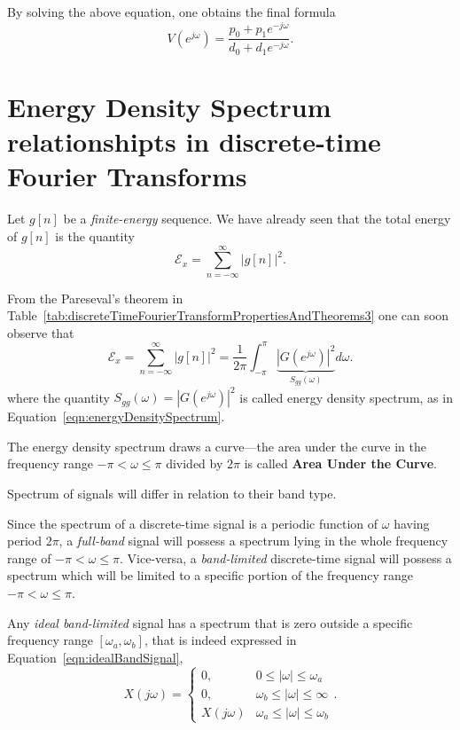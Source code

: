 \documentclass[\documentfontsize, twocolumn]{\classname}
\begin{document}
By solving the above equation, one obtains the final formula
\[
    V(e^{j\omega}) = \frac{p_0 + p_1 e^{-j\omega}}{d_0 + d_1e^{-j\omega}}.
\]

\section{Energy Density Spectrum relationshipts in discrete-time Fourier Transforms}

Let $g[n]$ be a \emph{finite-energy} sequence. We have already seen that the total energy of $g[n]$ is the quantity
\[
    \mathcal E_x = \sum_{n=-\infty}^\infty | g[n]|^2.
\]

From the Pareseval's theorem in Table~\ref{tab:discreteTimeFourierTransformPropertiesAndTheorems3} one can soon observe that
\begin{equation}\label{eqn:energyDensitySpectrumParseval}
    \mathcal E_x = \sum_{n=-\infty}^\infty | g[n]|^2 = \frac 1{2\pi} \int_{-\pi}^\pi \underbrace{\left|G(e^{j\omega})\right|^2}_{S_{gg}(\omega)} d\omega.
\end{equation}
where the quantity $S_{gg}(\omega) = \left|G(e^{j\omega})\right|^2$ is called energy density spectrum, as in Equation~\ref{eqn:energyDensitySpectrum}.

The energy density spectrum draws a curve---the area under the curve in the frequency range $-\pi < \omega \leq \pi$ divided by $2\pi$ is called \textbf{Area Under the Curve}.

Spectrum of signals will differ in relation to their band type.

Since the spectrum of a discrete-time signal is a periodic function of $\omega$ having period $2\pi$, a \emph{full-band} signal will possess a spectrum lying in the whole frequency range of $-\pi < \omega \leq \pi$. Vice-versa, a \emph{band-limited} discrete-time signal will possess a spectrum which will be limited to a specific portion of the frequency range $-\pi < \omega \leq \pi$.

Any \emph{ideal band-limited} signal has a spectrum that is zero outside a specific frequency range $[\omega_a, \omega_b]$, that is indeed expressed in Equation~\ref{eqn:idealBandSignal},
\[
    X(j\omega) = \left\{\begin{array}{ll}
        0,  &   0 \leq |\omega| \leq \omega_a\\
        0,  &   \omega_b \leq |\omega| \leq \infty\\
        X(j\omega)  &   \omega_a \leq |\omega| \leq \omega_b
    \end{array}\right..
\]
\end{document}
